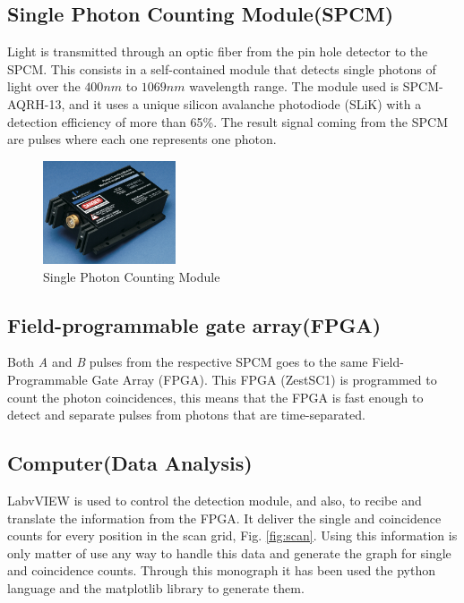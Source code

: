 \subsection{Single Photon Counting Module(SPCM)}

Light is transmitted through an optic fiber from the pin hole detector to the SPCM. This 
consists in a self-contained module that detects single photons of light over the $400nm$ to $1069 nm$
wavelength range. The module used  is SPCM-AQRH-13, and it uses a unique silicon avalanche photodiode (SLiK) with a detection efficiency of more than 65\%\cite{spcm}.
The result signal coming from the SPCM are pulses where each one represents one photon.
\begin{figure}[h]
\centering
\includegraphics[width=0.35\textwidth]{Figures/spcm.png}
\caption{Single Photon Counting Module} 
\label{fig:spcm}
\end{figure}


\subsection{Field-programmable gate array(FPGA)}
Both \textit{A} and \textit{B} pulses from the respective SPCM goes to the same Field-Programmable Gate Array (FPGA). This
FPGA (ZestSC1) is programmed
to count the photon coincidences, this means that the FPGA is fast enough to detect and separate pulses from photons 
that are time-separated. 




\subsection{Computer(Data Analysis)}
LabvVIEW is used to control the detection module, and also, to recibe and translate the information
from the FPGA. It deliver the single and coincidence counts for every position in the 
scan grid, Fig. \ref{fig:scan}. Using this information is only matter of use any way to handle
this data and generate the graph for single and coincidence counts. Through this monograph
it has been used the python language and the matplotlib library to generate them.


